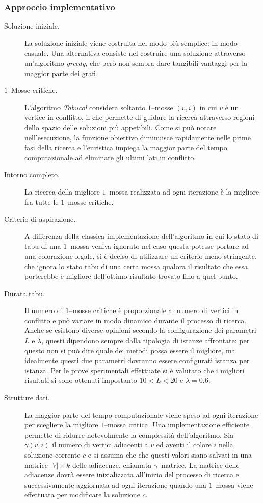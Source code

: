 \documentclass[a4paper,10pt]{article}
\newcommand{\tabucol}{\emph{Tabucol}}
\begin{document}
\subsubsection{Approccio implementativo}
\begin{description}
 \item[Soluzione iniziale.] La soluzione iniziale viene costruita nel modo più semplice: in modo casuale. Una alternativa consiste nel costruire una soluzione attraverso un'algoritmo \emph{greedy}, che però non sembra dare tangibili vantaggi per la maggior parte dei grafi.

\item[$1$--Mosse critiche.] L'algoritmo \tabucol{} considera soltanto $1$--mosse $(v,i)$ in cui $v$ è un vertice in conflitto, il che permette di guidare la ricerca attraverso regioni dello spazio delle soluzioni più appetibili. Come si può notare nell'esecuzione, la funzione obiettivo diminuisce rapidamente nelle prime fasi della ricerca e l'euristica impiega la maggior parte del tempo computazionale ad eliminare gli ultimi lati in conflitto.

\item[Intorno completo.] La ricerca della migliore $1$--mossa realizzata ad ogni iterazione è la migliore fra tutte le $1$--mosse critiche. 

\item[Criterio di aspirazione.] A differenza della classica implementazione dell'algoritmo in cui lo stato di tabu di una $1$--mossa veniva ignorato nel caso questa potesse portare ad una colorazione legale, si è deciso di utilizzare un criterio meno stringente, che ignora lo stato tabu di una certa mossa qualora il risultato che essa porterebbe è migliore dell'ottimo risultato trovato fino a quel punto.

\item[Durata tabu.] Il numero di $1$--mosse critiche è proporzionale al numero di vertici in conflitto e può variare in modo dinamico durante il processo di ricerca. Anche se esistono diverse opinioni secondo la configurazione dei parametri $L$ e $\lambda$, questi dipendono sempre dalla tipologia di istanze affrontate: per questo non si può dire quale dei metodi possa essere il migliore, ma idealmente questi due parametri dovranno essere configurati istanza per istanza. Per le prove sperimentali effettuate si è valutato che i migliori risultati si sono ottenuti impostanto $10<L<20$ e $\lambda=0.6$.

\item[Strutture dati.] La maggior parte del tempo computazionale viene speso ad ogni iterazione per scegliere la migliore $1$--mossa critica. Una implementazione efficiente permette di ridurre notevolmente la complessità dell'algoritmo. Sia $\gamma(v,i)$ il numero di vertici adiacenti a $v$ ed aventi il colore $i$ nella soluzione corrente $c$ e si assuma che che questi valori siano salvati in una matrice $|V|\times k$ delle adiacenze, chiamata $\gamma$--matrice. La matrice delle adiacenze dovrà essere inizializzata all'inizio del processo di ricerca e successivamente aggiornata ad ogni iterazione quando una $1$--mossa viene effettuata per modificare la soluzione $c$.


\end{description}
\end{document}
